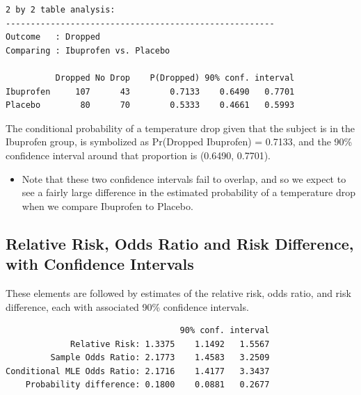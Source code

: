 \documentclass[
]{book}
\providecommand{\tightlist}{%
  \setlength{\itemsep}{0pt}\setlength{\parskip}{0pt}}
\begin{document}
\begin{verbatim}
2 by 2 table analysis: 
------------------------------------------------------ 
Outcome   : Dropped 
Comparing : Ibuprofen vs. Placebo 

          Dropped No Drop    P(Dropped) 90% conf. interval
Ibuprofen     107      43        0.7133    0.6490   0.7701
Placebo        80      70        0.5333    0.4661   0.5993
\end{verbatim}

The conditional probability of a temperature drop given that the subject is in the Ibuprofen group, is symbolized as Pr(Dropped \textbar{} Ibuprofen) = 0.7133, and the 90\% confidence interval around that proportion is (0.6490, 0.7701).

\begin{itemize}
\tightlist
\item
  Note that these two confidence intervals fail to overlap, and so we expect to see a fairly large difference in the estimated probability of a temperature drop when we compare Ibuprofen to Placebo.
\end{itemize}

\hypertarget{relative-risk-odds-ratio-and-risk-difference-with-confidence-intervals}{%
\subsection{Relative Risk, Odds Ratio and Risk Difference, with Confidence Intervals}\label{relative-risk-odds-ratio-and-risk-difference-with-confidence-intervals}}

These elements are followed by estimates of the relative risk, odds ratio, and risk difference, each with associated 90\% confidence intervals.

\begin{verbatim}
                                   90% conf. interval
             Relative Risk: 1.3375    1.1492   1.5567
         Sample Odds Ratio: 2.1773    1.4583   3.2509
Conditional MLE Odds Ratio: 2.1716    1.4177   3.3437
    Probability difference: 0.1800    0.0881   0.2677
\end{verbatim}
\end{document}
